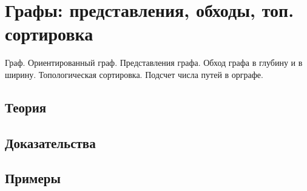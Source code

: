 
\section{Графы: представления, обходы, топ. сортировка}
\label{sec:1.3.06-graphs-traversal}

\begin{ticket}
Граф. Ориентированный граф. Представления графа. Обход графа в глубину и в ширину. Топологическая сортировка. Подсчет числа путей в орграфе.
\end{ticket}

\subsection*{Теория}

\subsection*{Доказательства}

\subsection*{Примеры}
